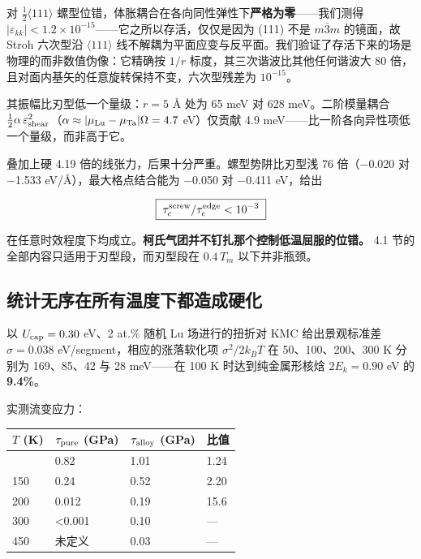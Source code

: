 \documentclass[11pt,a4paper]{article}
\begin{document}
对 \(\tfrac12\langle111\rangle\) 螺型位错，体胀耦合在各向同性弹性下\textbf{严格为零}------我们测得 \(|\varepsilon_{kk}| < 1.2\times10^{-15}\)------它之所以存活，仅仅是因为 (111) 不是 \(m\bar3m\) 的镜面，故 Stroh 六次型沿 \(\langle111\rangle\) 线不解耦为平面应变与反平面。我们验证了存活下来的场是物理的而非数值伪像：它精确按 \(1/r\) 标度，其三次谐波比其他任何谐波大 80 倍，且对面内基矢的任意旋转保持不变，六次型残差为 \(10^{-15}\)。

其振幅比刃型低一个量级：\(r = 5\) Å 处为 65 meV 对 628 meV。二阶模量耦合 \(\tfrac12\alpha\,\varepsilon_{\rm shear}^2\)（\(\alpha\approx|\mu_{\rm Lu}-\mu_{\rm Ta}|\Omega = 4.7\) eV）仅贡献 4.9 meV------比一阶各向异性项低一个量级，而非高于它。

叠加上硬 4.19 倍的线张力，后果十分严重。螺型势阱比刃型浅 76 倍（−0.020 对 −1.533 eV/Å），最大格点结合能为 −0.050 对 −0.411 eV，给出

\[\boxed{\;\tau_c^{\rm screw}/\tau_c^{\rm edge} < 10^{-3}\;}\]

在任意时效程度下均成立。\textbf{柯氏气团并不钉扎那个控制低温屈服的位错。} 4.1 节的全部内容只适用于刃型段，而刃型段在 \(0.4\,T_m\) 以下并非瓶颈。

\hypertarget{ux7edfux8ba1ux65e0ux5e8fux5728ux6240ux6709ux6e29ux5ea6ux4e0bux90fdux9020ux6210ux786cux5316}{%
\subsection{统计无序在所有温度下都造成硬化}\label{sec:ux7edfux8ba1ux65e0ux5e8fux5728ux6240ux6709ux6e29ux5ea6ux4e0bux90fdux9020ux6210ux786cux5316}}

以 \(U_{\rm cap} = 0.30\) eV、2 at.\% 随机 Lu 场进行的扭折对 KMC 给出景观标准差 \(\sigma = 0.038\) eV/segment，相应的涨落软化项 \(\sigma^2/2k_BT\) 在 50、100、200、300 K 分别为 169、85、42 与 28 meV------在 100 K 时达到纯金属形核焓 \(2E_k = 0.90\) eV 的 \textbf{9.4\%}。

实测流变应力：

\begin{longtable}[]{@{}llll@{}}
\toprule\noalign{}
\(T\) (K) & \(\tau_{\rm pure}\) (GPa) & \(\tau_{\rm alloy}\) (GPa) & 比值 \\
\midrule\noalign{}
\endhead
\bottomrule\noalign{}
\endlastfoot
100 & 0.82 & 1.01 & 1.24 \\
150 & 0.24 & 0.52 & 2.20 \\
200 & 0.012 & 0.19 & 15.6 \\
300 & \textless0.001 & 0.10 & --- \\
450 & 未定义 & 0.03 & --- \\
\end{longtable}
\end{document}
